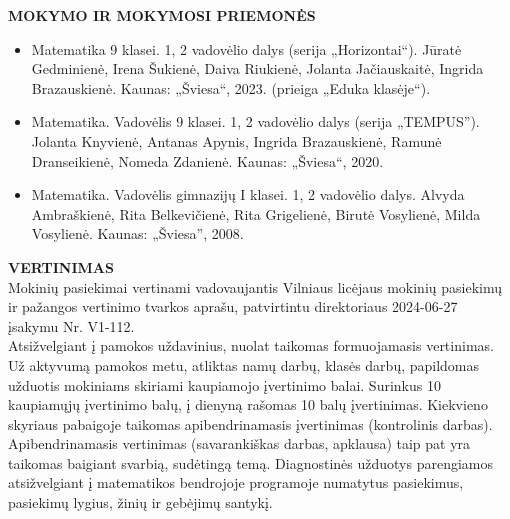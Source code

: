 \documentclass[11pt,a4paper]{article}
\begin{document}
\vspace{0.3cm}
\noindent \textbf{MOKYMO IR MOKYMOSI PRIEMONĖS}
\begin{itemize}
    \item Matematika 9 klasei. 1, 2 vadovėlio dalys (serija „Horizontai“). Jūratė Gedminienė, Irena Šukienė, Daiva Riukienė, Jolanta Jačiauskaitė, Ingrida Brazauskienė. Kaunas: „Šviesa“, 2023. (prieiga „Eduka klasėje“).
    \item Matematika. Vadovėlis 9 klasei. 1, 2 vadovėlio dalys (serija „TEMPUS”). Jolanta Knyvienė, Antanas Apynis, Ingrida Brazauskienė, Ramunė Dranseikienė, Nomeda Zdanienė. Kaunas: „Šviesa“, 2020.
    \item Matematika. Vadovėlis gimnazijų I klasei. 1, 2 vadovėlio dalys. Alvyda Ambraškienė, Rita Belkevičienė, Rita Grigelienė, Birutė Vosylienė, Milda Vosylienė. Kaunas: „Šviesa”, 2008.
\end{itemize}

\vspace{0.3cm}
\noindent \textbf{VERTINIMAS} \\
Mokinių pasiekimai vertinami vadovaujantis Vilniaus licėjaus mokinių pasiekimų ir pažangos vertinimo tvarkos aprašu, patvirtintu direktoriaus 2024-06-27 įsakymu Nr. V1-112. \\
Atsižvelgiant į pamokos uždavinius, nuolat taikomas formuojamasis vertinimas. Už aktyvumą pamokos metu, atliktas namų darbų, klasės darbų, papildomas užduotis mokiniams skiriami kaupiamojo įvertinimo balai. Surinkus 10 kaupiamųjų įvertinimo balų, į dienyną rašomas 10 balų įvertinimas. Kiekvieno skyriaus pabaigoje taikomas apibendrinamasis įvertinimas (kontrolinis darbas). Apibendrinamasis vertinimas (savarankiškas darbas, apklausa) taip pat yra taikomas baigiant svarbią, sudėtingą temą. Diagnostinės užduotys parengiamos atsižvelgiant į matematikos bendrojoje programoje numatytus pasiekimus, pasiekimų lygius, žinių ir gebėjimų santykį.

\vspace{0.5cm}
\end{document}
